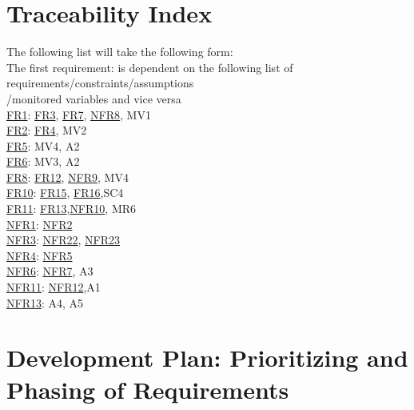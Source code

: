 \documentclass[12pt]{article}
\begin{document}
\section{Traceability Index}

The following list will take the following form:
\\The first requirement: is dependent on the following list of requirements/constraints/assumptions
\\
/monitored variables and vice versa
\\
 \hyperref[FR1]{FR1}: \hyperref[FR3]{FR3}, \hyperref[FR7]{FR7}, \hyperref[NFR8]{NFR8}, MV1
 \\  \hyperref[FR2]{FR2}: \hyperref[FR4]{FR4}, MV2
\\  \hyperref[FR5]{FR5}: MV4, A2
\\  \hyperref[FR6]{FR6}: MV3, A2
\\  \hyperref[FR8]{FR8}: \hyperref[FR12]{FR12}, \hyperref[NFR9]{NFR9}, MV4
\\  \hyperref[FR10]{FR10}: \hyperref[NFR15]{FR15}, \hyperref[NFR16]{FR16},SC4
\\  \hyperref[FR11]{FR11}: \hyperref[FR13]{FR13},\hyperref[NFR10]{NFR10}, MR6
\\  \hyperref[NFR1]{NFR1}: \hyperref[NFR2]{NFR2}
\\  \hyperref[NFR3]{NFR3}: \hyperref[NFR22]{NFR22}, \hyperref[NFR23]{NFR23}
\\  \hyperref[NFR4]{NFR4}: \hyperref[NFR5]{NFR5}
\\  \hyperref[NFR6]{NFR6}: \hyperref[NFR7]{NFR7}, A3
 \\  \hyperref[NFR11]{NFR11}: \hyperref[NFR12]{NFR12},A1
 \\  \hyperref[NFR13]{NFR13}: A4, A5
\section{Development Plan: Prioritizing and Phasing of Requirements}

\end{document}
